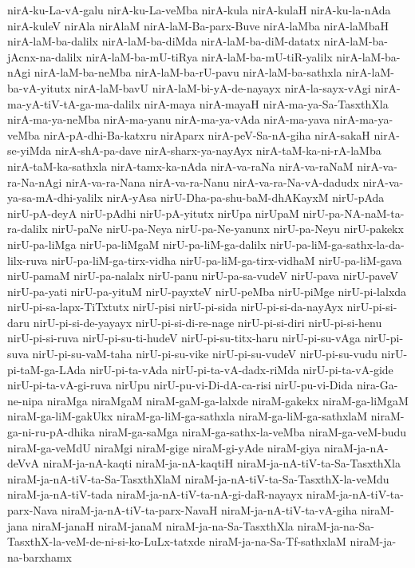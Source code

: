 {nirA-ku-La-vA-galu
nirA-ku-La-veMba
nirA-kula
nirA-kulaH
nirA-ku-la-nAda
nirA-kuleV
nirAla
nirAlaM
nirA-laM-Ba-parx-Buve
nirA-laMba
nirA-laMbaH
nirA-laM-ba-dalilx
nirA-laM-ba-diMda
nirA-laM-ba-diM-datatx
nirA-laM-ba-jAcnx-na-dalilx
nirA-laM-ba-mU-tiRya
nirA-laM-ba-mU-tiR-yalilx
nirA-laM-ba-nAgi
nirA-laM-ba-neMba
nirA-laM-ba-rU-pavu
nirA-laM-ba-sathxla
nirA-laM-ba-vA-yitutx
nirA-laM-bavU
nirA-laM-bi-yA-de-nayayx
nirA-la-sayx-vAgi
nirA-ma-yA-tiV-tA-ga-ma-dalilx
nirA-maya
nirA-mayaH
nirA-ma-ya-Sa-TasxthXla
nirA-ma-ya-neMba
nirA-ma-yanu
nirA-ma-ya-vAda
nirA-ma-yava
nirA-ma-ya-veMba
nirA-pA-dhi-Ba-katxru
nirAparx
nirA-peV-Sa-nA-giha
nirA-sakaH
nirA-se-yiMda
nirA-shA-pa-dave
nirA-sharx-ya-nayAyx
nirA-taM-ka-ni-rA-laMba
nirA-taM-ka-sathxla
nirA-tamx-ka-nAda
nirA-va-raNa
nirA-va-raNaM
nirA-va-ra-Na-nAgi
nirA-va-ra-Nana
nirA-va-ra-Nanu
nirA-va-ra-Na-vA-dadudx
nirA-va-ya-sa-mA-dhi-yalilx
nirA-yAsa
nirU-Dha-pa-shu-baM-dhAKayxM
nirU-pAda
nirU-pA-deyA
nirU-pAdhi
nirU-pA-yitutx
nirUpa
nirUpaM
nirU-pa-NA-naM-ta-ra-dalilx
nirU-paNe
nirU-pa-Neya
nirU-pa-Ne-yanunx
nirU-pa-Neyu
nirU-pakekx
nirU-pa-liMga
nirU-pa-liMgaM
nirU-pa-liM-ga-dalilx
nirU-pa-liM-ga-sathx-la-da-lilx-ruva
nirU-pa-liM-ga-tirx-vidha
nirU-pa-liM-ga-tirx-vidhaM
nirU-pa-liM-gava
nirU-pamaM
nirU-pa-nalalx
nirU-panu
nirU-pa-sa-vudeV
nirU-pava
nirU-paveV
nirU-pa-yati
nirU-pa-yituM
nirU-payxteV
nirU-peMba
nirU-piMge
nirU-pi-lalxda
nirU-pi-sa-lapx-TiTxtutx
nirU-pisi
nirU-pi-sida
nirU-pi-si-da-nayAyx
nirU-pi-si-daru
nirU-pi-si-de-yayayx
nirU-pi-si-di-re-nage
nirU-pi-si-diri
nirU-pi-si-henu
nirU-pi-si-ruva
nirU-pi-su-ti-hudeV
nirU-pi-su-titx-haru
nirU-pi-su-vAga
nirU-pi-suva
nirU-pi-su-vaM-taha
nirU-pi-su-vike
nirU-pi-su-vudeV
nirU-pi-su-vudu
nirU-pi-taM-ga-LAda
nirU-pi-ta-vAda
nirU-pi-ta-vA-dadx-riMda
nirU-pi-ta-vA-gide
nirU-pi-ta-vA-gi-ruva
nirUpu
nirU-pu-vi-Di-dA-ca-risi
nirU-pu-vi-Dida
nira-Ga-ne-nipa
niraMga
niraMgaM
niraM-gaM-ga-lalxde
niraM-gakekx
niraM-ga-liMgaM
niraM-ga-liM-gakUkx
niraM-ga-liM-ga-sathxla
niraM-ga-liM-ga-sathxlaM
niraM-ga-ni-ru-pA-dhika
niraM-ga-saMga
niraM-ga-sathx-la-veMba
niraM-ga-veM-budu
niraM-ga-veMdU
niraMgi
niraM-gige
niraM-gi-yAde
niraM-giya
niraM-ja-nA-deVvA
niraM-ja-nA-kaqti
niraM-ja-nA-kaqtiH
niraM-ja-nA-tiV-ta-Sa-TasxthXla
niraM-ja-nA-tiV-ta-Sa-TasxthXlaM
niraM-ja-nA-tiV-ta-Sa-TasxthX-la-veMdu
niraM-ja-nA-tiV-tada
niraM-ja-nA-tiV-ta-nA-gi-daR-nayayx
niraM-ja-nA-tiV-ta-parx-Nava
niraM-ja-nA-tiV-ta-parx-NavaH
niraM-ja-nA-tiV-ta-vA-giha
niraM-jana
niraM-janaH
niraM-janaM
niraM-ja-na-Sa-TasxthXla
niraM-ja-na-Sa-TasxthX-la-veM-de-ni-si-ko-LuLx-tatxde
niraM-ja-na-Sa-Tf-sathxlaM
niraM-ja-na-barxhamx
}

